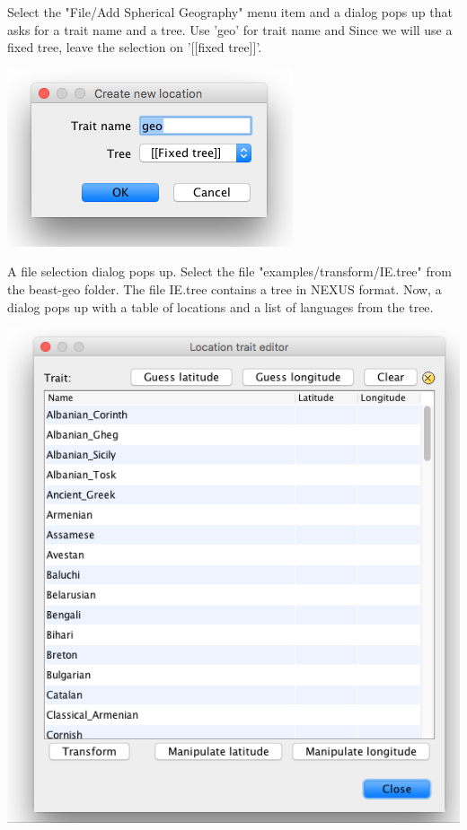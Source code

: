 \documentclass{article}
\begin{document}
Select the "File/Add Spherical Geography" menu item  and a dialog pops up that asks for a trait name and a tree. Use 'geo' for trait name and Since we will use a fixed tree, leave the selection on '[[fixed tree]]'.

\begin{center}
\includegraphics[scale=0.4]{figures/BEAUti_transform1}
\end{center}

A file selection dialog pops up. Select the file "examples/transform/IE.tree" from the beast-geo folder. The file IE.tree contains a tree in NEXUS format. Now, a dialog pops up with a table of locations and a list of languages from the tree.

\begin{center}
\includegraphics[scale=0.4]{figures/BEAUti_transform2}
\end{center}
\end{document}
